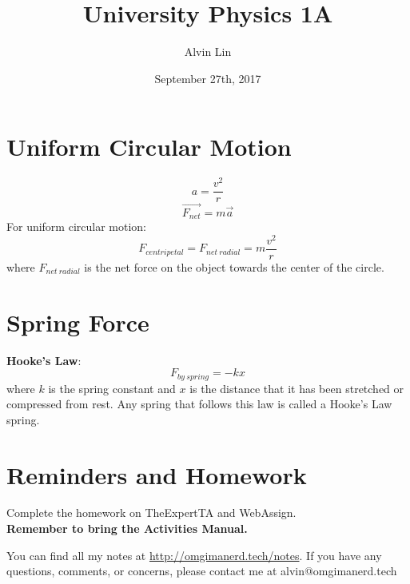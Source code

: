 \documentclass{math}
\title{University Physics 1A}
\author{Alvin Lin}
\date{September 27th, 2017}
\begin{document}
\maketitle

\section*{Uniform Circular Motion}
\begin{center}
\end{center}
\[ a = \frac{v^2}{r} \]
\[ \overrightarrow{F_{net}} = m\vec{a} \]
For uniform circular motion:
\[ F_{centripetal} = F_{net~radial} = m\frac{v^2}{r} \]
where \( F_{net~radial} \) is the net force on the object towards the center of
the circle.

\section*{Spring Force}
\textbf{Hooke's Law}:
\[ F_{by~spring} = -kx \]
where \( k \) is the spring constant and \( x \) is the distance that it has
been stretched or compressed from rest. Any spring that follows this law is
called a Hooke's Law spring.

\section*{Reminders and Homework}
Complete the homework on TheExpertTA and WebAssign. \\
\textbf{Remember to bring the Activities Manual.} \\

\begin{center}
  You can find all my notes at \url{http://omgimanerd.tech/notes}. If you have
  any questions, comments, or concerns, please contact me at
  alvin@omgimanerd.tech
\end{center}
\end{document}
